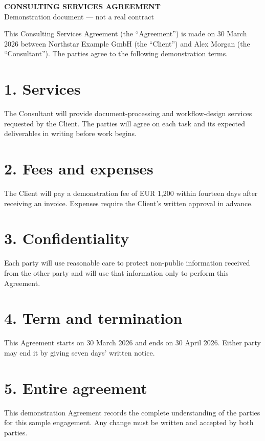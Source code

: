 \documentclass[11pt,a4paper]{article}
\begin{document}
\begin{center}
    {\Large\bfseries CONSULTING SERVICES AGREEMENT}\\[4pt]
    {\small Demonstration document --- not a real contract}
\end{center}

\vspace{1em}

This Consulting Services Agreement (the ``Agreement'') is made on 30 March
2026 between Northstar Example GmbH (the ``Client'') and Alex Morgan (the
``Consultant''). The parties agree to the following demonstration terms.

\section*{1. Services}
The Consultant will provide document-processing and workflow-design services
requested by the Client. The parties will agree on each task and its expected
deliverables in writing before work begins.

\section*{2. Fees and expenses}
The Client will pay a demonstration fee of EUR 1,200 within fourteen days after
receiving an invoice. Expenses require the Client's written approval in advance.

\section*{3. Confidentiality}
Each party will use reasonable care to protect non-public information received
from the other party and will use that information only to perform this
Agreement.

\section*{4. Term and termination}
This Agreement starts on 30 March 2026 and ends on 30 April 2026. Either party
may end it by giving seven days' written notice.

\section*{5. Entire agreement}
This demonstration Agreement records the complete understanding of the parties
for this sample engagement. Any change must be written and accepted by both
parties.
\end{document}

